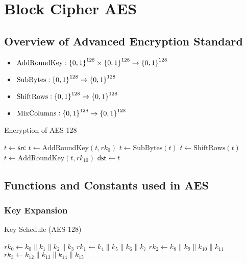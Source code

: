 \chapter{Block Cipher AES}

\section{Overview of Advanced Encryption Standard}

\begin{itemize}
	\item $\text{AddRoundKey}:\set{0,1}^{128}\times\set{0,1}^{128}\to\set{0,1}^{128}$
	\item $\text{SubBytes}:\set{0,1}^{128}\to\set{0,1}^{128}$
	\item $\text{ShiftRows}:\set{0,1}^{128}\to\set{0,1}^{128}$
	\item $\text{MixColumns}:\set{0,1}^{128}\to\set{0,1}^{128}$
\end{itemize}

\begin{algorithm}[H]
	\caption{Encryption of AES-128}
	
	\BlankLine
	$t \leftarrow \mathsf{src}$\;
	$t \leftarrow \text{AddRoundKey}(t, rk_0)$\;
	$t \leftarrow \text{SubBytes}(t)$\;
	$t \leftarrow \text{ShiftRows}(t)$\;
	$t \leftarrow \text{AddRoundKey}(t, rk_{10})$\;
	$\mathsf{dst} \leftarrow t$\;
	\;
\end{algorithm}

\newpage
\section{Functions and Constants used in AES}
\subsection{Key Expansion}

\begin{algorithm}[H]
	\caption{Key Schedule (AES-128)}
	
	\BlankLine
	\( rk_0 \leftarrow k_0\parallel k_1\parallel k_2 \parallel k_3 \)\;
	\( rk_1 \leftarrow k_4\parallel k_5\parallel k_6 \parallel k_7 \)\;
	\( rk_2 \leftarrow k_8\parallel k_9\parallel k_{10} \parallel k_{11} \)\;
	\( rk_3 \leftarrow k_{12}\parallel k_{13}\parallel k_{14} \parallel k_{15} \)\;
\end{algorithm}


